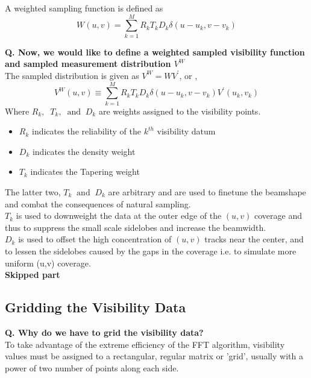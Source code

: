 \documentclass[10pt]{report}
\newcommand{\tbf}[1]{\textbf{#1}}
\begin{document}
A weighted sampling function is defined as 
\begin{equation}
W(u,v)=\sum^{M}_{k=1} R_kT_kD_k \delta(u-u_k,v-v_k)
\end{equation} 

\tbf{Q. Now, we would like to define a weighted sampled visibility function and sampled measurement distribution $V^W$}\\

The sampled distribution is given as $V^W=WV^\prime$, or ,
\begin{equation}
V^W(u,v)\equiv \sum^{M}_{k=1}R_k T_k D_k\delta(u-u_k,v-v_k)V^\prime (u_k,v_k)
\end{equation} 
Where $R_k,\;\; T_k,\;\; \text{and} \;\; D_k$ are weights assigned to the visibility points.

\begin{itemize}
\item $R_k$ indicates the reliability of the $k^{th}$ visibility datum
\item $D_k$ indicates the density weight
\item $T_k$ indicates the Tapering weight
\end{itemize}
The latter two, $T_k\;\; \text{and}\;\; D_k$ are arbitrary and are used to finetune the beamshape and combat the consequences of natural sampling.\\

 $T_k$ is used to downweight the data at the outer edge of the $(u,v)$ coverage and thus to suppress the small scale sidelobes and increase the beamwidth.\\
 
 $D_k$ is used to offset the high concentration of $(u,v)$ tracks near the center, and to lessen the sidelobes caused by the gaps in the coverage i.e. to simulate more uniform (u,v) coverage.\\
 
 \tbf{Skipped part}
 
 \subsection{Gridding the Visibility Data}
 \tbf{Q. Why do we have to grid the visibility data?}\\
 
 To take advantage of the extreme efficiency of the FFT algorithm, visibility values must be assigned to a rectangular, regular matrix or 'grid', usually with a power of two number of points along each side.\\
 
\end{document}
